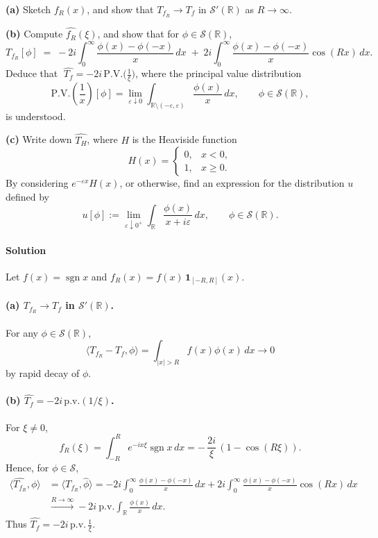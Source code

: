 \documentclass[12pt,a4paper]{article}
\theoremstyle{plain}
\theoremstyle{definition}
\theoremstyle{remark}
\theoremstyle{remark}
\begin{document}
\noindent
\textbf{(a)} Sketch $f_R(x)$, and show that $T_{f_R}\to T_f$ in $\mathcal S'(\mathbb R)$ as $R\to\infty$.

\smallskip
\noindent
\textbf{(b)} Compute $\widehat{f_R}(\xi)$, and show that for $\phi\in\mathcal S(\mathbb R)$,
\[
T_{f_R}[\phi] \;=\; -2i\int_{0}^{\infty}\frac{\phi(x)-\phi(-x)}{x}\,dx
\;+\; 2i\int_{0}^{\infty}\frac{\phi(x)-\phi(-x)}{x}\cos(Rx)\,dx.
\]
Deduce that $\;\widehat{T_f}=-2i\,\mathrm{P.V.}\!\big(\frac{1}{\xi}\big)$, where the principal value distribution
\[
\mathrm{P.V.}\!\left(\frac{1}{x}\right)[\phi]
=\lim_{\varepsilon\downarrow 0}\int_{\mathbb R\setminus(-\varepsilon,\varepsilon)}\frac{\phi(x)}{x}\,dx,
\qquad \phi\in\mathcal S(\mathbb R),
\]
is understood.

\smallskip
\noindent
\textbf{(c)} Write down $\widehat{T_H}$, where $H$ is the Heaviside function
\[
H(x)=
\begin{cases}
	0,& x<0,\\
	1,& x\ge 0.
\end{cases}
\]
By considering $e^{-\varepsilon x}H(x)$, or otherwise, find an expression for the distribution $u$ defined by
\[
u[\phi]:=\lim_{\varepsilon\downarrow 0^+}\int_{\mathbb R}\frac{\phi(x)}{x+i\varepsilon}\,dx,
\qquad \phi\in\mathcal S(\mathbb R).
\]

\bigskip
\bigskip

\paragraph*{Solution}

Let $f(x)=\operatorname{sgn}x$ and $f_R(x)=f(x)\,\mathbf 1_{[-R,R]}(x)$.

\paragraph{(a) $T_{f_R}\to T_f$ in $\mathcal S'(\mathbb R)$.}
For any $\phi\in\mathcal S(\mathbb R)$,
\[
\langle T_{f_R}-T_f,\phi\rangle
=\int_{|x|>R} f(x)\phi(x)\,dx \longrightarrow 0
\]
by rapid decay of $\phi$.

\smallskip

\paragraph{(b) $\widehat{T_f}=-2i\,\mathrm{p.v.}(1/\xi)$.}
For $\xi\neq0$,
\[
\widehat{f_R}(\xi)=\int_{-R}^R e^{-ix\xi}\operatorname{sgn}x\,dx
=-\,\frac{2i}{\xi}\,(1-\cos(R\xi)).
\]
Hence, for $\phi\in\mathcal S$,
\begin{align*}
	\langle \widehat{T_{f_R}},\phi\rangle
	&=\langle T_{f_R},\widehat\phi\rangle
	= -2i \int_0^\infty \frac{\phi(x)-\phi(-x)}{x}\,dx
	+2i \int_0^\infty \frac{\phi(x)-\phi(-x)}{x}\cos(Rx)\,dx \\
	&\xrightarrow{R\to\infty} -2i\ \mathrm{p.v.}\!\int_{\mathbb R}\frac{\phi(x)}{x}\,dx.
\end{align*}
Thus $\widehat{T_f}=-2i\,\mathrm{p.v.}\,\frac{1}{\xi}$.
\end{document}
